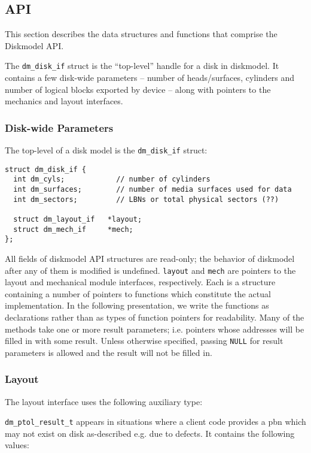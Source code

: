 
\subsection{API}

This section describes the data structures and functions that comprise
the Diskmodel API.

The \texttt{dm\_disk\_if} struct is the ``top-level'' handle for a
disk in diskmodel.  It contains a few disk-wide parameters -- number
of heads/surfaces, cylinders and number of logical blocks exported by
device -- along with pointers to the mechanics and layout interfaces.


\subsubsection{Disk-wide Parameters}

The top-level of a disk model is the \texttt{dm\_disk\_if} struct:

\begin{verbatim}
struct dm_disk_if {
  int dm_cyls;            // number of cylinders
  int dm_surfaces;        // number of media surfaces used for data
  int dm_sectors;         // LBNs or total physical sectors (??)

  struct dm_layout_if   *layout;
  struct dm_mech_if     *mech;
};
\end{verbatim}

All fields of diskmodel API structures are read-only; the behavior of
diskmodel after any of them is modified is undefined.  \texttt{layout}
and \texttt{mech} are pointers to the layout and mechanical module
interfaces, respectively.  Each is a structure containing a number of
pointers to functions which constitute the actual implementation.  In
the following presentation, we write the functions as declarations
rather than as types of function pointers for readability.  Many of the
methods take one or more result parameters; i.e. pointers whose
addresses will be filled in with some result.  Unless otherwise
specified, passing \texttt{NULL} for result parameters is allowed and
the result will not be filled in.


\subsubsection{Layout}

The layout interface uses the following auxiliary type:

\texttt{dm\_ptol\_result\_t} appears in situations where a client code
provides a pbn which may not exist on disk as-described e.g. due to
defects.  It contains the following values:


